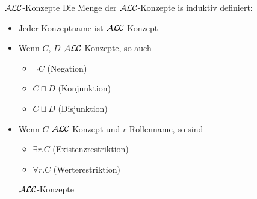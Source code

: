 \theoremstyle{definition}
\begin{definition}{$\mathcal{A}\mathcal{L}\mathcal{C}$-Konzepte}
	Die Menge der $\mathcal{A}\mathcal{L}\mathcal{C}$-Konzepte is induktiv definiert:
	\begin{itemize}
		\item Jeder Konzeptname ist $\mathcal{A}\mathcal{L}\mathcal{C}$-Konzept
		\item Wenn $C$, $D$ $\mathcal{A}\mathcal{L}\mathcal{C}$-Konzepte, so auch
		\begin{itemize}
			\item $\neg C$ \tabto{2cm}(Negation)
			\item $C \sqcap D$ \tabto{2cm}(Konjunktion)
			\item $C \sqcup D$ \tabto{2cm}(Disjunktion)
		\end{itemize}
		\item {Wenn $C$ $\mathcal{A}\mathcal{L}\mathcal{C}$-Konzept und $r$ Rollenname, so sind
		\begin{itemize}
			\item $\exists r.C$ \tabto{2cm}(Existenzrestriktion)
			\item $\forall r.C$ \tabto{2cm}(Werterestriktion)
		\end{itemize}
		$\mathcal{A}\mathcal{L}\mathcal{C}$-Konzepte}
	\end{itemize}
\end{definition}

